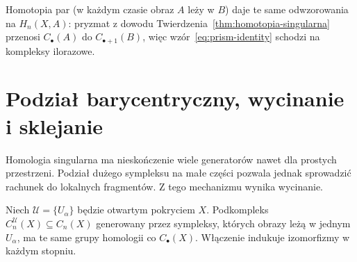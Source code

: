 Homotopia par (w każdym czasie obraz $A$
leży w $B$) daje te same odwzorowania na $H_n(X,A)$:
pryzmat z dowodu Twierdzenia~\ref{thm:homotopia-singularna}
przenosi $C_\bullet(A)$ do $C_{\bullet+1}(B)$,
więc wzór~\eqref{eq:prism-identity}
schodzi na kompleksy ilorazowe.

\section{Podział barycentryczny, wycinanie i sklejanie}
\label{sec:wycinanie-homologia}

Homologia singularna ma nieskończenie wiele generatorów nawet
dla prostych przestrzeni. Podział dużego sympleksu na małe
części pozwala jednak sprowadzić rachunek do lokalnych
fragmentów. Z tego mechanizmu wynika wycinanie.

\begin{lemat}
\label{lem:male-lancuchy}
Niech $\mathcal U=\{U_\alpha\}$ będzie otwartym
pokryciem $X$. Podkompleks
$C_n^{\mathcal U}(X)\subseteq C_n(X)$
generowany przez sympleksy, których obrazy
leżą w jednym $U_\alpha$, ma te same
grupy homologii co $C_\bullet(X)$.
Włączenie indukuje izomorfizmy w każdym stopniu.
\end{lemat}
